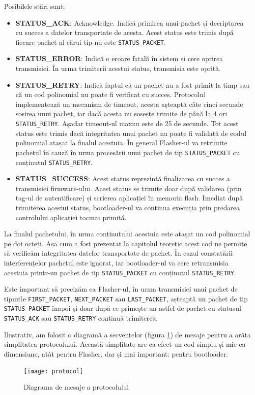 \documentclass[12pt,a4paper,titlepage]{report}
\begin{document}
Posibilele stări sunt:
\begin{itemize}
\item \textbf{STATUS\_ACK}: Acknowledge. Indică primirea unui pachet și decriptarea cu succes a datelor transportate de acesta. Acest status este trimis după fiecare pachet al cărui tip nu este \texttt{STATUS\_PACKET}.
\item \textbf{STATUS\_ERROR}: Indică o eroare fatală în sistem și cere oprirea transmisiei. În urma trimiterii acestui status, transmisia este oprită.
\item \textbf{STATUS\_RETRY}: Indică faptul că un pachet nu a fost primit la timp sau că un cod polinomial nu poate fi verificat cu succes. Protocolul implementează un mecanism de timeout, acesta așteaptă câte cinci secunde sosirea unui pachet, iar dacă acesta nu sosește trimite de până la 4 ori \texttt{STATUS\_RETRY}. Așadar timeout-ul maxim este de 25 de secunde. Tot acest status este trimis dacă integritatea unui pachet nu poate fi validată de codul polinomial atașat la finalul acestuia. În general Flasher-ul va retrimite pachetul în cauză în urma procesării unui pachet de tip \texttt{STATUS\_PACKET} cu conținutul \texttt{STATUS\_RETRY}.
\item \textbf{STATUS\_SUCCESS}: Acest status reprezintă finalizarea cu succes a transmisiei firmware-ului. Acest status se trimite doar după validarea (prin tag-ul de autentificare) și scrierea aplicației în memoria flash. Imediat după trimiterea acestui status, bootloader-ul va continua execuția prin predarea controlului aplicației tocmai primită.
\end{itemize}

La finalul pachetului, în urma conținutului acestuia este atașat un cod polinomial pe doi octeți. Așa cum a fost prezentat la capitolul teoretic acest cod ne permite să verificăm integritatea datelor transportate de pachet. În cazul constatării interferențelor pachetul este ignorat, iar bootloader-ul va cere retransmisia acestuia printr-un pachet de tip \texttt{STATUS\_PACKET} cu conținutul \texttt{STATUS\_RETRY}.

Este important să precizăm ca Flasher-ul, în urma transmisiei unui pachet de tipurile \texttt{FIRST\_PACKET}, \texttt{NEXT\_PACKET} sau \texttt{LAST\_PACKET}, așteaptă un pachet de tip \texttt{STATUS\_PACKET} înapoi și doar după ce primește un astfel de pachet cu statusul \texttt{STATUS\_ACK} sau \texttt{STATUS\_RETRY} continuă trimiterea.

Ilustrativ, am folosit o diagramă a secvențelor (figura \ref{protocol-msd}) de mesaje pentru a arăta simplitatea protocolului. Această simplitate are ca efect un cod simplu și mic ca dimensiune, atât pentru Flasher, dar și mai important: pentru bootloader.
\begin{figure}[h]
    \centering
    \texttt{[image: protocol]}
    \caption{Diagrama de mesaje a protocolului}
    \label{protocol-msd}
\end{figure}
\end{document}
